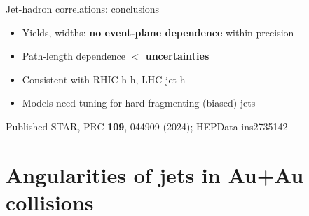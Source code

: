\documentclass[10pt, aspectratio=169]{beamer}
\begin{document}
\begin{frame}{Jet-hadron correlations: conclusions}
	\begin{itemize}
		\item Yields, widths: \textbf{no event-plane dependence} within precision
		\item Path-length dependence \textbf{\(<\) uncertainties}
		\item Consistent with RHIC h-h, LHC jet-h
		\item Models need tuning for hard-fragmenting (biased) jets
	\end{itemize}
	\vspace{3mm}
	\begin{block}{Published}
		STAR, PRC \textbf{109}, 044909 (2024); HEPData ins2735142
	\end{block}
\end{frame}

\section{Angularities of jets in Au+Au collisions}
\end{document}
